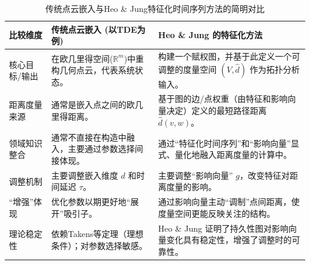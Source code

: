 \begin{table}[htbp]
    \centering
    \caption{传统点云嵌入与Heo \& Jung特征化时间序列方法的简明对比}
    \label{tab:embedding_comparison_concise_new}
    \begin{tabular}{>{\raggedright\arraybackslash}p{} >{\raggedright\arraybackslash}p{} >{\raggedright\arraybackslash}p{}}
        \toprule
        \textbf{比较维度}                          & \textbf{传统点云嵌入 (以TDE为例)} & \textbf{Heo \& Jung 的特征化方法} \\
        \midrule
        核心目标/输出                                &
        在欧几里得空间($\mathbb{R}^m$)中重构几何点云，代表系统状态。 &
        构建一个赋权图，并基于此定义一个可调整的度量空间 $(V, \hat{d})$ 作为拓扑分析输入。                                               \\
        \addlinespace
        距离度量来源                                 &
        通常是嵌入点之间的欧几里得距离。                       &
        基于图的边/点权重（由特征和影响向量决定）定义的最短路径距离 $\hat{d}(v,w)$。                                                  \\
        \addlinespace
        领域知识整合                                 &
        通常不直接在构造中融入，主要通过参数选择间接体现。              &
        通过“特征化时间序列”和“影响向量”显式、量化地融入距离度量的计算中。                                                             \\
        \addlinespace
        调整机制                                   &
        主要调整嵌入维度 $d$ 和时间延迟 $\tau$。             &
        主要调整“影响向量” $g$，改变特征对距离度量的影响。                                                                    \\
        \addlinespace
        “增强”体现                                 &
        优化参数以期更好地“展开”吸引子。                      &
        通过影响向量主动“调制”点间距离，使度量空间更能反映关注的结构。                                                                \\
        \addlinespace
        理论稳定性                                  &
        依赖Takens等定理（理想条件）；对参数选择敏感。             &
        Heo \& Jung 证明了持久性图对影响向量变化具有稳定性，增强了调整时的可靠性。                                                     \\
        \bottomrule
    \end{tabular}
\end{table}

